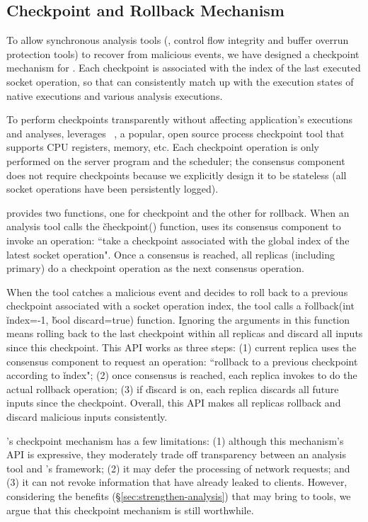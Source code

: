 \subsection{Checkpoint and Rollback Mechanism} \label{sec:checkpoint}

To allow synchronous analysis tools (\eg, control flow integrity and buffer 
overrun protection tools) to recover from malicious events, we have designed a 
checkpoint mechanism for \xxx. Each checkpoint is associated with the index of the last 
executed socket operation, so that \xxx can consistently match up with the execution 
states of native executions and various analysis executions.

To perform checkpoints transparently without affecting application's executions and analyses, \xxx 
leverages \criu~\cite{criu}, a popular, open source process checkpoint tool 
that supports CPU registers, memory, etc. Each checkpoint operation is only performed on the 
server program and the \dmt scheduler; the \paxos consensus component does not 
require checkpoints because we explicitly design it to be stateless (all socket 
operations have been persistently logged). 

\xxx provides two functions, one for checkpoint and the other for rollback.
When an analysis tool calls the \v{checkpoint()} function, \xxx uses 
its \paxos consensus component to invoke an operation: ``take a checkpoint 
associated with the global index of the latest socket operation". Once a 
consensus is reached, all replicas (including primary) do a checkpoint 
operation as the next consensus operation.


When the tool catches a malicious event and decides to roll back to a previous
checkpoint associated with a socket operation index, the tool calls a 
\v{rollback(int} \v{index=-1,} \v{bool discard=true)} function. Ignoring the 
arguments in this function means rolling back to the last checkpoint within all 
replicas and discard all inputs since this checkpoint. This API works as three 
steps: (1) current replica uses the \paxos consensus component to request an 
operation: ``rollback to a previous checkpoint according to \v{index}"; (2) 
once consensus is reached, each replica invokes \criu to do the actual rollback 
operation; (3) if \v{discard} is on, each replica discards all future inputs 
since the checkpoint. Overall, this API makes all replicas rollback and discard 
malicious inputs consistently.


\xxx's checkpoint mechanism has a few limitations: (1) although this mechanism's 
API is expressive, they moderately trade off transparency between an analysis 
tool and \xxx's framework; (2) it may defer the processing of network requests; 
and (3) it can not revoke information that have already leaked to clients. 
However, considering the benefits (\S\ref{sec:strengthen-analysis}) that \xxx 
may bring to tools, we argue that this checkpoint mechanism is still worthwhile.



